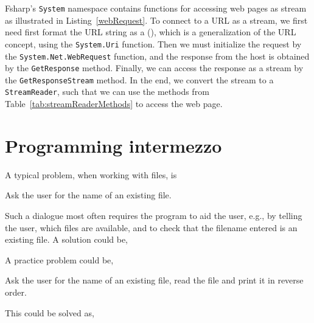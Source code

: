 Fsharp's \lstinline!System! namespace contains functions for accessing web pages as stream as illustrated in Listing~\ref{webRequest}.
%
%
To connect to a URL as a stream, we first need first format the URL string as a  (), which is a generalization of the URL concept, using the \lstinline!System.Uri! function. Then we must initialize the request by the \lstinline!System.Net.WebRequest! function, and the response from the host is obtained by the \lstinline!GetResponse! method. Finally, we can access the response as a stream by the \lstinline!GetResponseStream! method. In the end, we convert the stream to a \lstinline!StreamReader!, such that we can use the methods from Table~\ref{tab:streamReaderMethods} to access the web page.


\section{Programming intermezzo}
A typical problem, when working with files, is
\begin{problem}
  Ask the user for the name of an existing file.
\end{problem}
Such a dialogue most often requires the program to aid the user, e.g., by telling the user, which files are available, and to check that the filename entered is an existing file. A solution could be,
%
%

A practice problem could be,
\begin{problem}
  Ask the user for the name of an existing file, read the file and print it in reverse order.
\end{problem}
This could be solved as,
%
%

